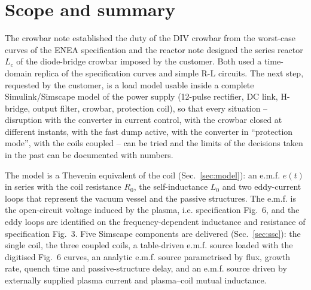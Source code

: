 \documentclass[11pt,a4paper]{article}
\begin{document}
\tableofcontents

\section{Scope and summary}
\label{sec:scope}
The crowbar note \cite{crowbar_note} established the duty of the DIV crowbar from the worst-case curves of the ENEA specification \cite{enea_spec} and the reactor note \cite{lc_note} designed the series reactor $L_c$ of the diode-bridge crowbar imposed by the customer. Both used a time-domain replica of the specification curves and simple R-L circuits. The next step, requested by the customer, is a load model usable inside a complete Simulink/Simscape model of the power supply (12-pulse rectifier, DC link, H-bridge, output filter, crowbar, protection coil), so that every situation -- disruption with the converter in current control, with the crowbar closed at different instants, with the fast dump active, with the converter in ``protection mode'', with the coils coupled -- can be tried and the limits of the decisions taken in the past can be documented with numbers.

The model is a Thevenin equivalent of the coil (Sec.~\ref{sec:model}): an e.m.f. $e(t)$ in series with the coil resistance $R_0$, the self-inductance $L_0$ and two eddy-current loops that represent the vacuum vessel and the passive structures. The e.m.f. is the open-circuit voltage induced by the plasma, i.e. specification Fig.~6, and the eddy loops are identified on the frequency-dependent inductance and resistance of specification Fig.~3. Five Simscape components are delivered (Sec.~\ref{sec:ssc}): the single coil, the three coupled coils, a table-driven e.m.f. source loaded with the digitised Fig.~6 curves, an analytic e.m.f. source parametrised by flux, growth rate, quench time and passive-structure delay, and an e.m.f. source driven by externally supplied plasma current and plasma--coil mutual inductance.
\end{document}
